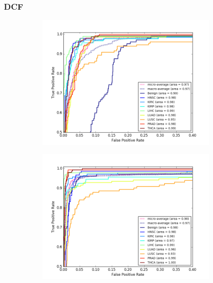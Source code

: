\subsubsection{DCF}

\begin{figure}[H]
     \centering
     \begin{subfigure}[b]{0.49\textwidth}
         \centering
         \includegraphics[width=\textwidth]{img/c_r/c_r_dcf_dgmu_roc.png}
         \caption{}
     \end{subfigure}
     \hfill
     \begin{subfigure}[b]{0.49\textwidth}
         \centering
         \includegraphics[width=\textwidth]{img/c_r/c_r_dcf_gmu_roc.png}

\end{subfigure}
\end{figure}
